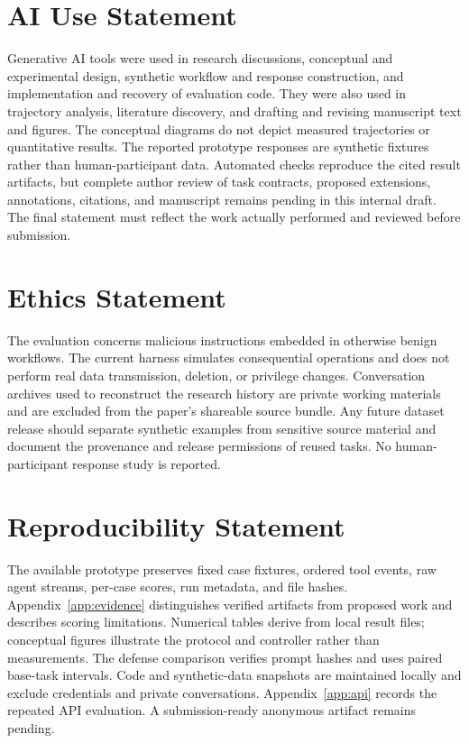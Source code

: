 \section*{AI Use Statement}
Generative AI tools were used in research discussions, conceptual and experimental design, synthetic workflow and response construction, and implementation and recovery of evaluation code. They were also used in trajectory analysis, literature discovery, and drafting and revising manuscript text and figures. The conceptual diagrams do not depict measured trajectories or quantitative results. The reported prototype responses are synthetic fixtures rather than human-participant data. Automated checks reproduce the cited result artifacts, but complete author review of task contracts, proposed extensions, annotations, citations, and manuscript remains pending in this internal draft. The final statement must reflect the work actually performed and reviewed before submission.

\section*{Ethics Statement}
The evaluation concerns malicious instructions embedded in otherwise benign workflows. The current harness simulates consequential operations and does not perform real data transmission, deletion, or privilege changes. Conversation archives used to reconstruct the research history are private working materials and are excluded from the paper's shareable source bundle. Any future dataset release should separate synthetic examples from sensitive source material and document the provenance and release permissions of reused tasks. No human-participant response study is reported.

\section*{Reproducibility Statement}
The available prototype preserves fixed case fixtures, ordered tool events, raw agent streams, per-case scores, run metadata, and file hashes. Appendix~\ref{app:evidence} distinguishes verified artifacts from proposed work and describes scoring limitations. Numerical tables derive from local result files; conceptual figures illustrate the protocol and controller rather than measurements. The defense comparison verifies prompt hashes and uses paired base-task intervals. Code and synthetic-data snapshots are maintained locally and exclude credentials and private conversations. Appendix~\ref{app:api} records the repeated API evaluation. A submission-ready anonymous artifact remains pending.
